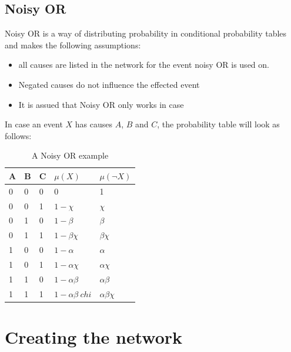 \documentclass[12pt]{article} %
\begin{document}
\subsection{Noisy OR}
{
    Noisy OR is a way of distributing probability in conditional probability tables
    and makes the following assumptions:
    \begin{itemize}
        \item all causes are listed in the network for the event noisy OR is
            used on.
        \item Negated causes do not influence the effected event
        \item It is assued that Noisy OR only works in case 
    \end{itemize}
    In case an event $X$ has causes $A$, $B$ and $C$, the probability table will
    look as follows:

\FloatBarrier
\begin{centering}
    \begin{table}
        \begin{tabular}{|lll|ll|}
            \hline
            A & B & C & $\mu(X)$ & $\mu(\neg X)$ \\ \hline
            0 & 0 & 0 &   0      & 1\\
            0 & 0 & 1  &  $1 - \chi$  & $\chi$       \\ 
            0 & 1 & 0  &  $1 - \beta$ & $\beta$\\
            0 & 1 & 1  &  $1 - \beta\chi$ & $\beta \chi$\\       
            1 & 0 & 0  &  $1 - \alpha$ & $\alpha$     \\                     
            1 & 0 & 1  &  $1 - \alpha \chi$& $\alpha \chi$\\   
            1 & 1 & 0  &  $1 - \alpha \beta$&$\alpha \beta$ \\         
            1 & 1 & 1  &  $1 - \alpha \beta \ chi$  & $\alpha \beta \chi$ \\
            \hline
        \end{tabular}
        \caption{A Noisy OR example}
        \label{ref:money}
    \end{table}
\end{centering}



}

\section{Creating the network} %
\end{document}
